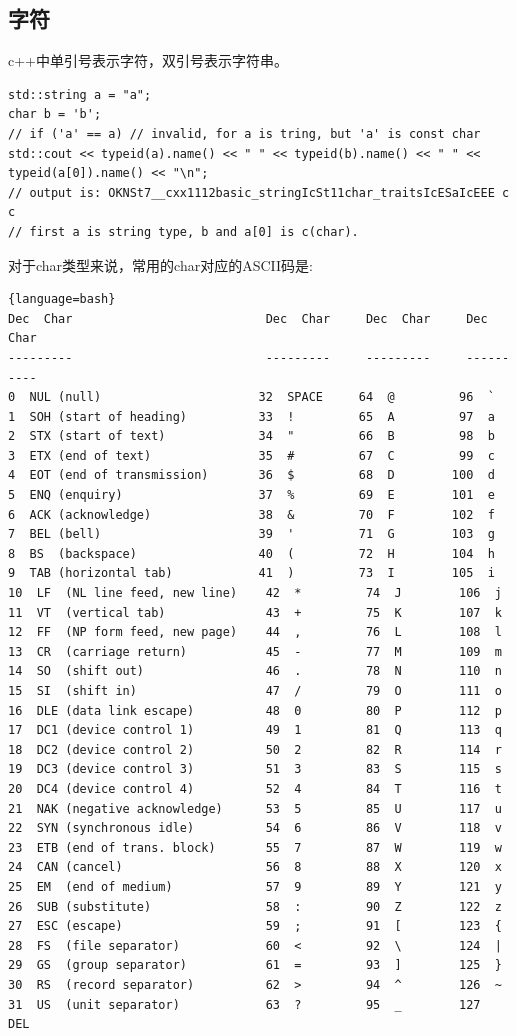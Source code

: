 \documentclass[12pt]{book}
\begin{document}
\subsection{字符}
c++中单引号表示字符，双引号表示字符串。

\begin{lstlisting}
std::string a = "a";
char b = 'b';
// if ('a' == a) // invalid, for a is tring, but 'a' is const char
std::cout << typeid(a).name() << " " << typeid(b).name() << " " << typeid(a[0]).name() << "\n";
// output is: OKNSt7__cxx1112basic_stringIcSt11char_traitsIcESaIcEEE c c
// first a is string type, b and a[0] is c(char).
\end{lstlisting}

对于char类型来说，常用的char对应的ASCII码是:
\begin{lstlisting}{language=bash}
Dec  Char                           Dec  Char     Dec  Char     Dec  Char
---------                           ---------     ---------     ----------
0  NUL (null)                      32  SPACE     64  @         96  `
1  SOH (start of heading)          33  !         65  A         97  a
2  STX (start of text)             34  "         66  B         98  b
3  ETX (end of text)               35  #         67  C         99  c
4  EOT (end of transmission)       36  $         68  D        100  d
5  ENQ (enquiry)                   37  %         69  E        101  e
6  ACK (acknowledge)               38  &         70  F        102  f
7  BEL (bell)                      39  '         71  G        103  g
8  BS  (backspace)                 40  (         72  H        104  h
9  TAB (horizontal tab)            41  )         73  I        105  i
10  LF  (NL line feed, new line)    42  *         74  J        106  j
11  VT  (vertical tab)              43  +         75  K        107  k
12  FF  (NP form feed, new page)    44  ,         76  L        108  l
13  CR  (carriage return)           45  -         77  M        109  m
14  SO  (shift out)                 46  .         78  N        110  n
15  SI  (shift in)                  47  /         79  O        111  o
16  DLE (data link escape)          48  0         80  P        112  p
17  DC1 (device control 1)          49  1         81  Q        113  q
18  DC2 (device control 2)          50  2         82  R        114  r
19  DC3 (device control 3)          51  3         83  S        115  s
20  DC4 (device control 4)          52  4         84  T        116  t
21  NAK (negative acknowledge)      53  5         85  U        117  u
22  SYN (synchronous idle)          54  6         86  V        118  v
23  ETB (end of trans. block)       55  7         87  W        119  w
24  CAN (cancel)                    56  8         88  X        120  x
25  EM  (end of medium)             57  9         89  Y        121  y
26  SUB (substitute)                58  :         90  Z        122  z
27  ESC (escape)                    59  ;         91  [        123  {
28  FS  (file separator)            60  <         92  \        124  |
29  GS  (group separator)           61  =         93  ]        125  }
30  RS  (record separator)          62  >         94  ^        126  ~
31  US  (unit separator)            63  ?         95  _        127  DEL
\end{lstlisting}
\end{document}
